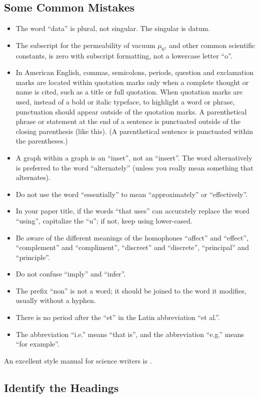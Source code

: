 \documentclass[conference]{IEEEtran}
\begin{document}
\subsection{Some Common Mistakes}\label{SCM}
\begin{itemize}
\item The word ``data'' is plural, not singular. The singular is datum.
\item The subscript for the permeability of vacuum $\mu_{0}$, and other common scientific constants, is zero with subscript formatting, not a lowercase letter ``o''.
\item In American English, commas, semicolons, periods, question and exclamation marks are located within quotation marks only when a complete thought or name is cited, such as a title or full quotation. When quotation marks are used, instead of a bold or italic typeface, to highlight a word or phrase, punctuation should appear outside of the quotation marks. A parenthetical phrase or statement at the end of a sentence is punctuated outside of the closing parenthesis (like this). (A parenthetical sentence is punctuated within the parentheses.)
\item A graph within a graph is an ``inset'', not an ``insert''. The word alternatively is preferred to the word ``alternately'' (unless you really mean something that alternates).
\item Do not use the word ``essentially'' to mean ``approximately'' or ``effectively''.
\item In your paper title, if the words ``that uses'' can accurately replace the word ``using'', capitalize the ``u''; if not, keep using lower-cased.
\item Be aware of the different meanings of the homophones ``affect'' and ``effect'', ``complement'' and ``compliment'', ``discreet'' and ``discrete'', ``principal'' and ``principle''.
\item Do not confuse ``imply'' and ``infer''.
\item The prefix ``non'' is not a word; it should be joined to the word it modifies, usually without a hyphen.
\item There is no period after the ``et'' in the Latin abbreviation ``et al.''.
\item The abbreviation ``i.e.'' means ``that is'', and the abbreviation ``e.g.'' means ``for example''.
\end{itemize}
An excellent style manual for science writers is \cite{b7}.


\subsection{Identify the Headings}
\end{document}
